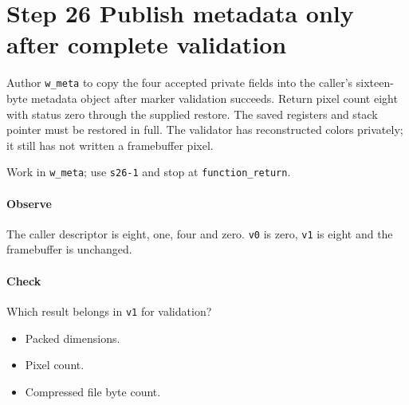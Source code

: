 \section{Step 26 Publish metadata only after complete validation}\label{qoi-s26}
Author \texttt{w\_meta} to copy the four accepted private fields into the caller’s sixteen-byte metadata object after marker validation succeeds. Return pixel count eight with status zero through the supplied restore. The saved registers and stack pointer must be restored in full. The validator has reconstructed colors privately; it still has not written a framebuffer pixel.

Work in \texttt{w\_meta}; use \texttt{s26-1} and stop at \texttt{function\_return}.

\paragraph{Observe} The caller descriptor is eight, one, four and zero. \texttt{v0} is zero, \texttt{v1} is eight and the framebuffer is unchanged.

\paragraph{Check} Which result belongs in \texttt{v1} for validation?
\begin{itemize}
  \item[A.] Packed dimensions.
  \item[B.] Pixel count.
  \item[C.] Compressed file byte count.
\end{itemize}
